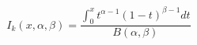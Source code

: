 

\[
I_{k}(x,\alpha,\beta) = \frac{\int_{0}^{x} {t^{\alpha-1}(1-t)^{\beta-1}dt}} {B(\alpha,\beta) }
\]



